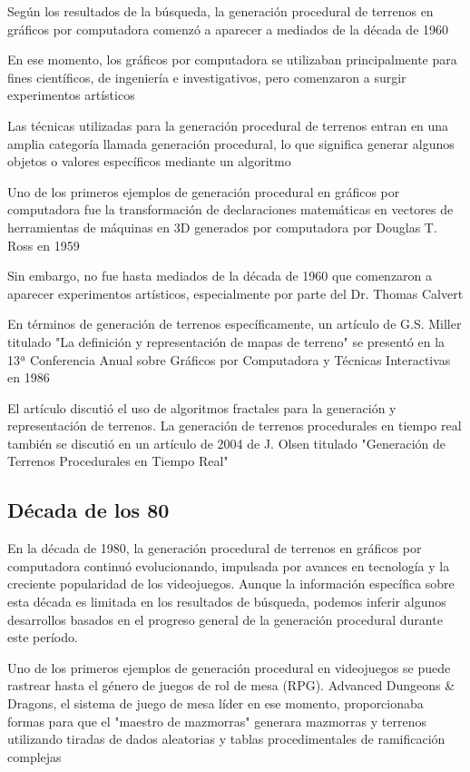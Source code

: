 Según los resultados de la búsqueda, la generación procedural de terrenos en gráficos por computadora comenzó a aparecer a mediados de la década de 1960

En ese momento, los gráficos por computadora se utilizaban principalmente para fines científicos, de ingeniería e investigativos, pero comenzaron a surgir experimentos artísticos \cite{HistoryofComputerAnimation}

Las técnicas utilizadas para la generación procedural de terrenos entran en una amplia categoría llamada generación procedural, lo que significa generar algunos objetos o valores específicos mediante un algoritmo \cite{ComputerGraphicsLearningMaterials}

Uno de los primeros ejemplos de generación procedural en gráficos por computadora fue la transformación de declaraciones matemáticas en vectores de herramientas de máquinas en 3D generados por computadora por Douglas T. Ross en 1959\cite{ComputerGraphics}

Sin embargo, no fue hasta mediados de la década de 1960 que comenzaron a aparecer experimentos artísticos, especialmente por parte del Dr. Thomas Calvert

En términos de generación de terrenos específicamente, un artículo de G.S. Miller titulado "La definición y representación de mapas de terreno" se presentó en la 13ª Conferencia Anual sobre Gráficos por Computadora y Técnicas Interactivas en 1986 \cite{SurveyProceduralWorlds}

El artículo discutió el uso de algoritmos fractales para la generación y representación de terrenos. La generación de terrenos procedurales en tiempo real también se discutió en un artículo de 2004 de J. Olsen titulado "Generación de Terrenos Procedurales en Tiempo Real"
\subsection{Década de los 80}

En la década de 1980, la generación procedural de terrenos en gráficos por computadora continuó evolucionando, impulsada por avances en tecnología y la creciente popularidad de los videojuegos. Aunque la información específica sobre esta década es limitada en los resultados de búsqueda, podemos inferir algunos desarrollos basados en el progreso general de la generación procedural durante este período.

Uno de los primeros ejemplos de generación procedural en videojuegos se puede rastrear hasta el género de juegos de rol de mesa (RPG). Advanced Dungeons \& Dragons, el sistema de juego de mesa líder en ese momento, proporcionaba formas para que el "maestro de mazmorras" generara mazmorras y terrenos utilizando tiradas de dados aleatorias y tablas procedimentales de ramificación complejas

